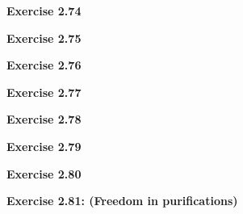 \documentclass{article}
\begin{document}
\bigskip

\begin{framed}
    \noindent \textbf{Exercise 2.74}
    
    \medskip
    
    
\end{framed}

\bigskip

\begin{framed}
    \noindent \textbf{Exercise 2.75}
    
    \medskip
    
    
\end{framed}

\bigskip

\begin{framed}
    \noindent \textbf{Exercise 2.76}
    
    \medskip
    
    
\end{framed}

\bigskip

\begin{framed}
    \noindent \textbf{Exercise 2.77}
    
    \medskip
    
    
\end{framed}

\bigskip

\begin{framed}
    \noindent \textbf{Exercise 2.78}
    
    \medskip
    
    
\end{framed}

\bigskip

\begin{framed}
    \noindent \textbf{Exercise 2.79}
    
    \medskip
    
    
\end{framed}

\bigskip

\begin{framed}
    \noindent \textbf{Exercise 2.80}
    
    \medskip
    
    
\end{framed}

\bigskip

\begin{framed}
    \noindent \textbf{Exercise 2.81: (Freedom in purifications)}
    
    \medskip
    
    
\end{framed}
\end{document}
